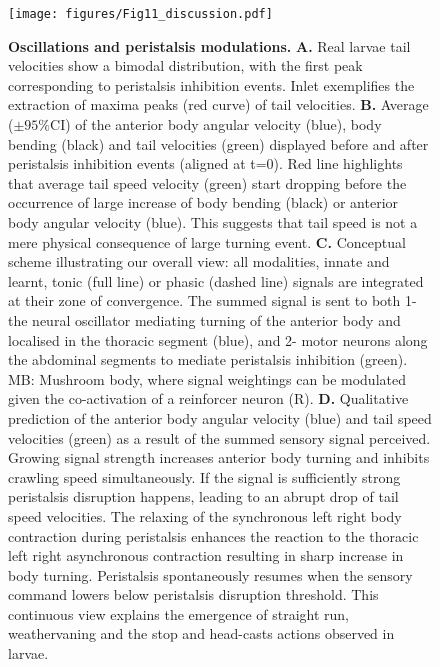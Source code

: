 \documentclass[10pt,a4paper]{article}
\begin{document}
\begin{figure}[!ht]
\begin{center}
\texttt{[image: figures/Fig11\_discussion.pdf]}
\caption{{\bf Oscillations and peristalsis modulations.} {\bf A.} Real larvae tail velocities show a bimodal distribution, with the first peak corresponding to peristalsis inhibition events. Inlet exemplifies the extraction of maxima peaks (red curve) of tail velocities.
{\bf  B.} Average ($\pm 95\%$CI) of the anterior body angular velocity (blue), body bending (black) and tail velocities (green) displayed before and after peristalsis inhibition events (aligned at t=0). Red line highlights that average tail speed velocity (green) start dropping before the occurrence of large increase of body bending (black) or anterior body angular velocity (blue). This suggests that tail speed is not a mere physical consequence of large turning event.
{\bf C.} Conceptual scheme illustrating our overall view: all modalities, innate and learnt, tonic (full line) or phasic (dashed line) signals are integrated at their zone of convergence. The summed signal is sent to both 1-the neural oscillator mediating turning of the anterior body and localised in the thoracic segment (blue), and 2- motor neurons along the abdominal segments to mediate peristalsis inhibition (green). MB: Mushroom body, where signal weightings can be modulated given the co-activation of a reinforcer neuron (R).
{\bf D.} Qualitative prediction of the anterior body angular velocity (blue) and tail speed velocities (green) as a result of the summed sensory signal perceived. Growing signal strength increases anterior body turning and inhibits crawling speed simultaneously. If the signal is sufficiently strong peristalsis disruption happens, leading to an abrupt drop of tail speed velocities. The relaxing of the synchronous left right body contraction during peristalsis enhances the reaction to the thoracic left right asynchronous contraction resulting in sharp increase in body turning. Peristalsis spontaneously resumes when the sensory command lowers below peristalsis disruption threshold. This continuous view explains the emergence of straight run, weathervaning and the stop and head-casts actions observed in larvae.
\label{fig:Fig11}}
\end{center}
\end{figure}
\end{document}
